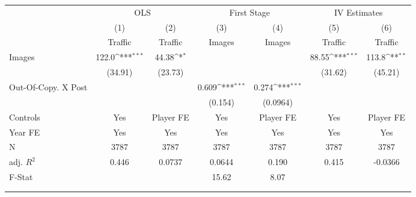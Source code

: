 {
\def\sym#1{\ifmmode^{#1}\else\(^{#1}\)\fi}
\begin{tabular}{l*{6}{c}}
\toprule
                    &\multicolumn{2}{c}{OLS}                    &\multicolumn{2}{c}{First Stage}            &\multicolumn{2}{c}{IV Estimates}           \\\cmidrule(lr){2-3}\cmidrule(lr){4-5}\cmidrule(lr){6-7}
                    &\multicolumn{1}{c}{(1)}&\multicolumn{1}{c}{(2)}&\multicolumn{1}{c}{(3)}&\multicolumn{1}{c}{(4)}&\multicolumn{1}{c}{(5)}&\multicolumn{1}{c}{(6)}\\
                    &\multicolumn{1}{c}{Traffic}&\multicolumn{1}{c}{Traffic}&\multicolumn{1}{c}{Images}&\multicolumn{1}{c}{Images}&\multicolumn{1}{c}{Traffic}&\multicolumn{1}{c}{Traffic}\\
\midrule
Images              &       122.0\sym{***}&       44.38\sym{*}  &                     &                     &       88.55\sym{***}&       113.8\sym{**} \\
                    &     (34.91)         &     (23.73)         &                     &                     &     (31.62)         &     (45.21)         \\
\addlinespace
Out-Of-Copy. X Post &                     &                     &       0.609\sym{***}&       0.274\sym{***}&                     &                     \\
                    &                     &                     &     (0.154)         &    (0.0964)         &                     &                     \\
\midrule
Controls            &         Yes         &   Player FE         &         Yes         &   Player FE         &         Yes         &   Player FE         \\
Year FE             &         Yes         &         Yes         &         Yes         &         Yes         &         Yes         &         Yes         \\
N                   &        3787         &        3787         &        3787         &        3787         &        3787         &        3787         \\
adj. $R^2$          &       0.446         &      0.0737         &      0.0644         &       0.190         &       0.415         &     -0.0366         \\
F-Stat              &                     &                     &       15.62         &        8.07         &                     &                     \\
\bottomrule
\multicolumn{7}{l}{\footnotesize }\\
\multicolumn{7}{l}{\footnotesize }\\
\end{tabular}
}
